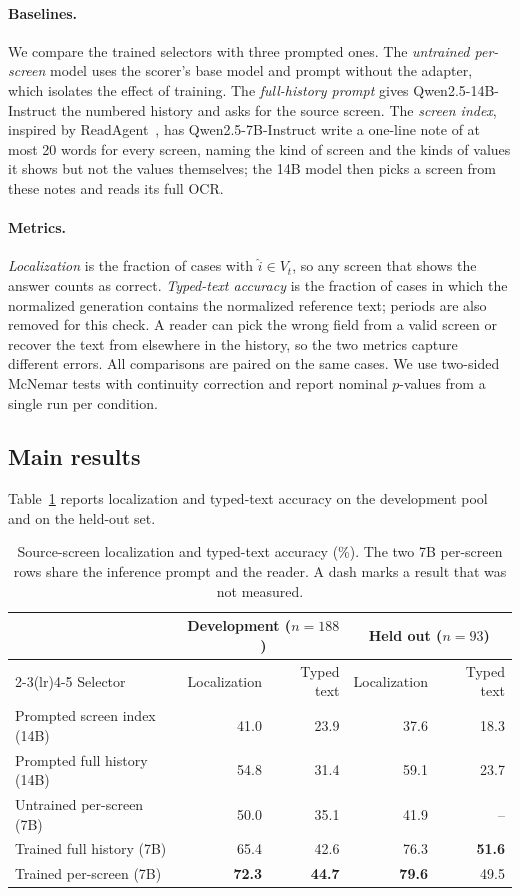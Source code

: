 \paragraph{Baselines.} We compare the trained selectors with three prompted ones. The \emph{untrained per-screen} model uses the scorer's base model and prompt without the adapter, which isolates the effect of training. The \emph{full-history prompt} gives Qwen2.5-14B-Instruct the numbered history and asks for the source screen. The \emph{screen index}, inspired by ReadAgent~\citep{readagent}, has Qwen2.5-7B-Instruct write a one-line note of at most 20 words for every screen, naming the kind of screen and the kinds of values it shows but not the values themselves; the 14B model then picks a screen from these notes and reads its full OCR.

\paragraph{Metrics.} \emph{Localization} is the fraction of cases with $\hat i\in V_t$, so any screen that shows the answer counts as correct. \emph{Typed-text accuracy} is the fraction of cases in which the normalized generation contains the normalized reference text; periods are also removed for this check. A reader can pick the wrong field from a valid screen or recover the text from elsewhere in the history, so the two metrics capture different errors. All comparisons are paired on the same cases. We use two-sided McNemar tests with continuity correction and report nominal $p$-values from a single run per condition.

\subsection{Main results}
\label{sec:main}
Table~\ref{tab:main} reports localization and typed-text accuracy on the development pool and on the held-out set.

\begin{table}[t]\centering
\caption{Source-screen localization and typed-text accuracy (\%). The two 7B per-screen rows share the inference prompt and the reader. A dash marks a result that was not measured.}
\label{tab:main}\small
\begin{tabular}{lrrrr}\toprule
& \multicolumn{2}{c}{Development ($n=188$)}&\multicolumn{2}{c}{Held out ($n=93$)}\\
\cmidrule(lr){2-3}\cmidrule(lr){4-5}
Selector & Localization & Typed text & Localization & Typed text\\\midrule
Prompted screen index (14B) &41.0 &23.9 &37.6 &18.3\\
Prompted full history (14B) &54.8 &31.4 &59.1 &23.7\\
Untrained per-screen (7B) &50.0 &35.1 &41.9 & --\\\midrule
Trained full history (7B) &65.4 &42.6 &76.3 &\textbf{51.6}\\
Trained per-screen (7B) &\textbf{72.3} &\textbf{44.7} &\textbf{79.6} &49.5\\\bottomrule
\end{tabular}\end{table}

